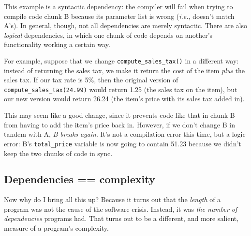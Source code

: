 This example is a syntactic dependency: the compiler will fail when trying to
compile code chunk B because its parameter list is wrong (\textit{i.e.},
doesn't match A's). In general, though, not all dependencies are merely
syntactic. There are also \textit{logical} dependencies, in which one chunk of
code depends on another's functionality working a certain way.

For example, suppose that we change \texttt{compute\_sales\_tax()} in a
different way: instead of returning the sales tax, we make it return the cost
of the item \textit{plus} the sales tax. If our tax rate is 5\%, then the
original version of \texttt{compute\_sales\_tax(24.99)} would return 1.25 (the
sales tax on the item), but our new version would return 26.24 (the item's
price with its sales tax added in).

This may seem like a good change, since it prevents code like that in chunk B
from having to add the item's price back in. However, if we don't change B in
tandem with A, \textit{B breaks again}. It's not a compilation error this
time, but a logic error: B's \texttt{total\_price} variable is now going to
contain 51.23 because we didn't keep the two chunks of code in sync.

\subsection{Dependencies == complexity}

Now why do I bring all this up? Because it turns out that the \textit{length}
of a program was not the cause of the software crisis. Instead, it was
\textit{the number of dependencies} programs had. That turns out to be a
different, and more salient, measure of a program's complexity.

